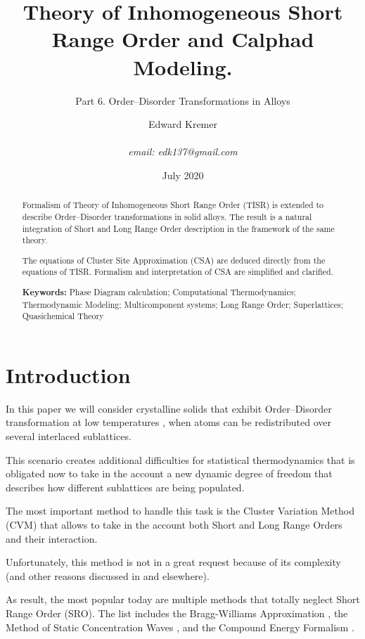 \documentclass[12pt,abstract]{scrartcl}
\title{Theory of Inhomogeneous Short Range Order and Calphad Modeling. }
\author{Edward Kremer \\ \\ \textit{email: edk137@gmail.com}}
\subtitle{Part 6. Order--Disorder Transformations in Alloys}
\date{July 2020}
\begin{document}
\maketitle

\begin{abstract}

Formalism of Theory of Inhomogeneous Short Range Order (TISR) is extended to describe Order--Disorder transformations in solid alloys.
The result is a natural  integration of Short and Long Range Order description in the framework of the same theory.

The equations of Cluster Site Approximation (CSA) are deduced directly from the equations of  TISR.
Formalism and interpretation of CSA are  simplified and clarified. 

\textbf{Keywords:} Phase Diagram calculation; Computational Thermodynamics;  Thermodynamic Modeling; Multicomponent systems; Long Range Order; Superlattices; Quasichemical Theory

\end{abstract}



\section{Introduction}

In this paper we will consider crystalline solids that exhibit Order--Disorder  transformation at low temperatures  \cite{porter2009}, when atoms can be redistributed over several interlaced sublattices.

This scenario creates additional difficulties for statistical thermodynamics that is obligated now to take in the account a new dynamic degree of freedom that  describes how different sublattices are being  populated.

The most important method to handle this task is the Cluster Variation Method (CVM) \cite{moran2012} that allows to take in the account both Short and Long Range Orders and their interaction. 

Unfortunately, this method is not in a great request because of its complexity (and other reasons  discussed in \cite{TISR_p1} and elsewhere).

As result, the most popular today are multiple methods that totally neglect Short Range Order (SRO).
The list  includes the Bragg-Williams Approximation \cite{krivoglaz1964}, the Method of Static Concentration Waves \cite{khachaturyan2013}, and the Compound Energy Formalism \cite{hanslukas2007}.
\end{document}
